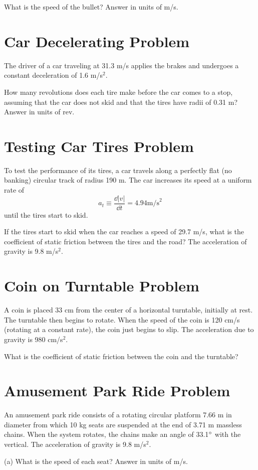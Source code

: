\documentclass[../physics12.tex]{subfiles}
\begin{document}
What is the speed of the bullet?
Answer in units of m/s.

\section{Car Decelerating Problem}
The driver of a car traveling at 31.3 m/s applies the brakes and undergoes a constant deceleration of 1.6 m/s$^2$.

How many revolutions does each tire make before the car comes to a stop, assuming that the car does not skid and that the tires have radii of 0.31 m?
Answer in units of rev.

\section{Testing Car Tires Problem}
To test the performance of its tires, a car travels along a perfectly flat (no banking) circular track of radius 190 m.
The car increases its speed at a uniform rate of 
\[ a_t \equiv \frac{\dd |v|}{\dd t} = 4.94 \text{m/s}^2\]
until the tires start to skid.

If the tires start to skid when the car reaches a speed of 29.7 m/s, what is the coefficient of static friction between the tires and the road?
The acceleration of gravity is 9.8 m/s$^2$.

\section{Coin on Turntable Problem}
A coin is placed 33 cm from the center of a horizontal turntable, initially at rest. The turntable then begins to rotate.
When the speed of the coin is 120 cm/s (rotating at a constant rate), the coin just begins to slip. The acceleration due to gravity is 980 cm/s$^2$.

What is the coefficient of static friction between the coin and the turntable?

\section{Amusement Park Ride Problem}
An amusement park ride consists of a rotating circular platform 7.66 m in diameter from which 10 kg seats are suspended at the end of 3.71 m massless chains.
When the system rotates, the chains make an angle of 33.1$\degree$ with the vertical.
The acceleration of gravity is 9.8 m/s$^2$.

(a) What is the speed of each seat? 
Answer in units of m/s.
\end{document}
